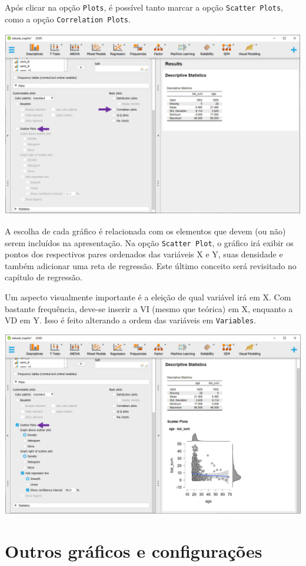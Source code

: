 \documentclass[
]{book}
\begin{document}
Após clicar na opção \texttt{Plots}, é possível tanto marcar a opção
\texttt{Scatter\ Plots}, como a opção \texttt{Correlation\ Plots}.

\includegraphics{./img/cap_desc_jasp_grafico_scatter2.png}

A escolha de cada gráfico é relacionada com os elementos que devem (ou
não) serem incluídos na apresentação. Na opção \texttt{Scatter\ Plot}, o
gráfico irá exibir os pontos dos respectivos pares ordenados das
variáveis X e Y, suas densidade e também adicionar uma reta de
regressão. Este último conceito será revisitado no capítulo de
regressão.

Um aspecto visualmente importante é a eleição de qual variável irá em X.
Com bastante frequência, deve-se inserir a VI (mesmo que teórica) em X,
enquanto a VD em Y. Isso é feito alterando a ordem das variáveis em
\texttt{Variables}.

\includegraphics{./img/cap_desc_jasp_grafico_scatter3.png}

\hypertarget{outros-gruxe1ficos-e-configurauxe7uxf5es-1}{%
\section{Outros gráficos e
configurações}\label{outros-gruxe1ficos-e-configurauxe7uxf5es-1}}
\end{document}
